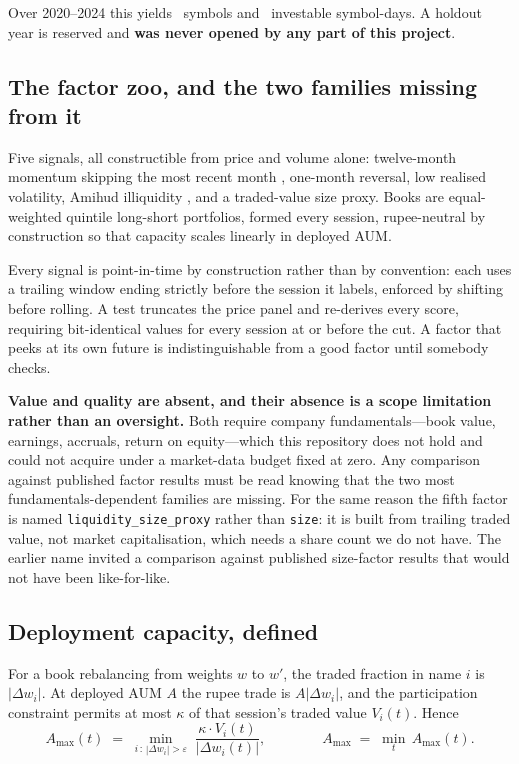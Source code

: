 \documentclass[11pt,a4paper]{article}
\begin{document}
Over 2020--2024 this yields \fsNSymbols\ symbols and \fsNInvestableSymbolDays\ investable
symbol-days. A holdout year is reserved and \textbf{was never opened by any part of this project}.

\subsection{The factor zoo, and the two families missing from it}
\label{sec:zoo}

Five signals, all constructible from price and volume alone: twelve-month momentum skipping the most
recent month \citep{jegadeesh1993}, one-month reversal, low realised volatility, Amihud illiquidity
\citep{amihud2002}, and a traded-value size proxy. Books are equal-weighted quintile long-short
portfolios, formed every session, rupee-neutral by construction so that capacity scales linearly in
deployed AUM.

Every signal is point-in-time by construction rather than by convention: each uses a trailing window
ending strictly before the session it labels, enforced by shifting before rolling. A test truncates
the price panel and re-derives every score, requiring bit-identical values for every session at or
before the cut. A factor that peeks at its own future is indistinguishable from a good factor until
somebody checks.

\textbf{Value and quality are absent, and their absence is a scope limitation rather than an
oversight.} Both require company fundamentals---book value, earnings, accruals, return on
equity---which this repository does not hold and could not acquire under a market-data budget fixed
at zero. Any comparison against published factor results must be read knowing that the two most
fundamentals-dependent families are missing. For the same reason the fifth factor is named
\texttt{liquidity\_size\_proxy} rather than \texttt{size}: it is built from trailing traded value,
not market capitalisation, which needs a share count we do not have. The earlier name invited a
comparison against published size-factor results that would not have been like-for-like.

\subsection{Deployment capacity, defined}

For a book rebalancing from weights $w$ to $w'$, the traded fraction in name $i$ is
$|\Delta w_i|$. At deployed AUM $A$ the rupee trade is $A|\Delta w_i|$, and the participation
constraint permits at most $\kappa$ of that session's traded value $V_i(t)$. Hence
\[
A_{\max}(t) \;=\; \min_{i \,:\, |\Delta w_i| > \varepsilon}\;
  \frac{\kappa \cdot V_i(t)}{|\Delta w_i(t)|},
\qquad\qquad
A_{\max} \;=\; \min_t\, A_{\max}(t).
\]
\end{document}
